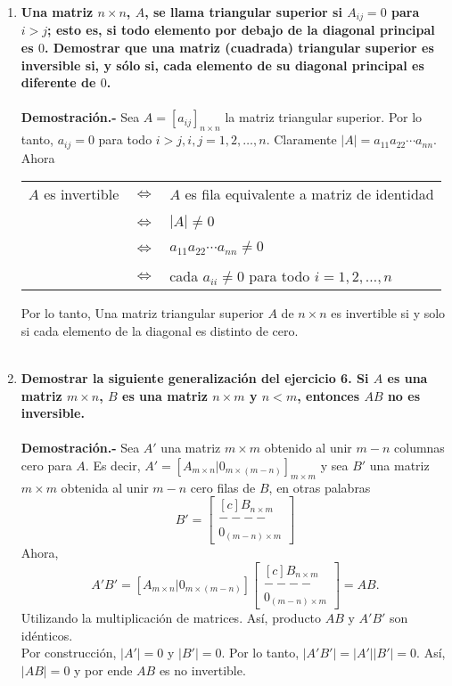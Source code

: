 \begin{enumerate}
    \item \textbf{\boldmath Una matriz $n\times n$, $A$, se llama triangular superior si $A_{ij}=0$ para $i>j$; esto es, si todo elemento por debajo de la diagonal principal es $0$. Demostrar que una matriz (cuadrada) triangular superior es inversible si, y sólo si, cada elemento de su diagonal principal es diferente de $0$.\\\\
	Demostración.-}\; Sea $A=\left[a_{ij}\right]_{n\times n}$ la matriz triangular superior. Por lo tanto, $a_{ij}=0$ para todo $i>j,i,j=1,2,\ldots, n$. Claramente $|A|=a_{11}a_{22}\cdots a_{nn}$. Ahora
	\begin{center}
	    \begin{tabular}{rcl}
		$A$ es invertible & $\Leftrightarrow$ & $A$ es fila equivalente a matriz de identidad\\\\
				  & $\Leftrightarrow$ & $|A|\neq 0$\\\\
				  & $\Leftrightarrow$ & $a_{11} a_{22} \cdots a_{nn}\neq 0$\\\\
				  & $\Leftrightarrow$ & cada $a_{ii}\neq 0$ para todo $i=1,2,\ldots , n$
	    \end{tabular}
	\end{center}
	Por lo tanto, Una matriz triangular superior $A$ de $n \times n$ es invertible si y solo si cada elemento de la diagonal es distinto de cero.\\\\


    \item \textbf{\boldmath Demostrar la siguiente generalización del ejercicio 6. Si $A$ es una matriz $m\times n$, $B$ es una matriz $n\times m$ y $n<m$, entonces $AB$ no es inversible.\\\\
	Demostración.-}\; Sea $A'$ una matriz $m\times m$ obtenido al unir $m-n$ columnas cero para $A$. Es decir, $A'=\left[A_{m\times n}|0_{m\times (m-n)}\right]_{m\times m}$ y sea $B'$ una matriz $m\times m$ obtenida al unir $m-n$ cero filas de $B$, en otras palabras
	$$B'=\begin{bmatrix*}[c]
	    B_{n\times m}\\
	    ----\\
	    0_{(m-n)\times m}
	\end{bmatrix*}$$
	Ahora,
	$$A'B'=\left[A_{m\times n}|0_{m\times (m-n)}\right]
	\begin{bmatrix*}[c]
	    B_{n\times m}\\
	    ----\\
	    0_{(m-n)\times m}
	\end{bmatrix*} =AB.$$
	Utilizando la multiplicación de matrices. Así, producto $AB$ y $A'B'$ son idénticos. \\
	Por construcción, $|A'|=0$ y $|B'|=0.$ Por lo tanto, $|A'B'|=|A'||B'|=0$. Así, $|AB|=0$ y por ende $AB$ es no invertible.\\\\



\end{enumerate}
